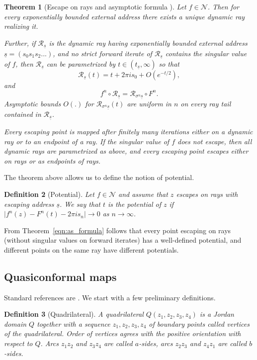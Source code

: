 \documentclass[10pt,reqno,a4paper]{amsart}
\numberwithin{figure}{section}
\numberwithin{equation}{section}
\newtheorem{thm}{Theorem}[section]
\newtheorem{defn}[thm]{Definition}
\newcommand{\abs}[1]{\lvert #1 \rvert}
\begin{document}
\begin{thm}[Escape on rays and asymptotic formula \cite{SZ-Escaping}]
	\label{thm:as_formula}
	Let $f\in\mathcal{N}$. Then for every exponentially bounded external address there exists a unique dynamic ray realizing it.
	
	Further, if $\mathcal{R}_{\underline{s}}$ is the dynamic ray having exponentially bounded external address $\underline{s}=(s_0 s_1 s_2 ... )$, and no strict forward iterate of $\mathcal{R}_{\underline{s}}$ contains the singular value of $f$, then $\mathcal{R}_{\underline{s}}$ can be parametrized by $t\in(t_{\underline{s}},\infty)$ so that 
	\begin{equation}
		\label{eqn:as_formula}
		\mathcal{R}_{\underline{s}}(t)=t+2\pi i s_0 + O(e^{-t/2}),
	\end{equation}
	and $$f^n\circ \mathcal{R}_{\underline{s}}=\mathcal{R}_{\sigma^n \underline{s}}\circ F^n.$$ Asymptotic bounds $O(.)$ for $\mathcal{R}_{\sigma^n\underline{s}}(t)$ are uniform in $n$ on every ray tail contained in $\mathcal{R}_{\underline{s}}$.
	
	Every escaping point is mapped after finitely many iterations either on a dynamic ray or to an endpoint of a ray. If the singular value of $f$ does not escape, then all dynamic rays are parametrized as above, and every escaping point escapes either on rays or as endpoints of rays.
\end{thm}

The theorem above allows us to define the notion of potential.

\begin{defn}[Potential]
	Let $f\in \mathcal{N}$ and assume that $z$ escapes on rays with escaping address $\underline{s}$. We say that $t$ is the potential of $z$ if $\abs{f^n(z)-F^n(t)-2\pi is_n}\to 0$ as $n\to\infty$.	
\end{defn}

From Theorem~\ref{eqn:as_formula} follows that every point escaping on rays (without singular values on forward iterates) has a well-defined potential, and different points on the same ray have different potentials.

\subsection{Quasiconformal maps}
Standard references are \cite{Ahlfors,LehtoVirtanen}. We start with a few preliminary definitions.

\begin{defn}[Quadrilateral]
	A \emph{quadrilateral} $Q(z_1,z_2,z_3,z_4)$ is a Jordan domain $Q$ together with a sequence $z_1,z_2,z_3,z_4$ of boundary points called vertices of the quadrilateral. Order of vertices agrees with the positive orientation with respect to $Q$. Arcs $z_1 z_2$ and $z_3 z_4$ are called $a$-sides, arcs $z_2 z_3$ and $z_4 z_1$ are called $b$-sides.
\end{defn}
\end{document}
